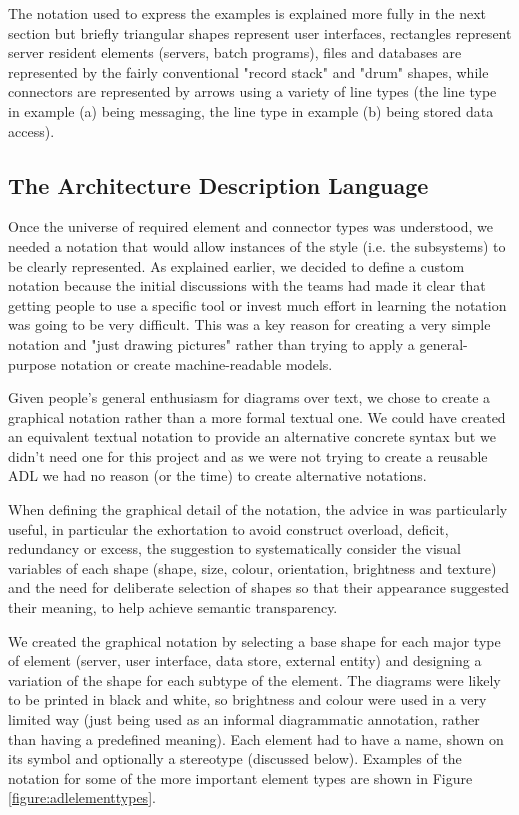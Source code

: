   The notation used to express the examples is explained more fully in the next section but briefly triangular shapes represent user interfaces, rectangles represent server resident elements (servers, batch programs), files and databases are represented by the fairly conventional "record stack" and "drum" shapes, while connectors are represented by arrows using a variety of line types (the line type in example (a) being messaging, the line type in example (b) being stored data access).

\subsection{The Architecture Description Language}

  Once the universe of required element and connector types was understood, we needed a notation that would allow instances of the style (i.e. the subsystems) to be clearly represented.  As explained earlier, we decided to define a custom notation because the initial discussions with the teams had made it clear that getting people to use a specific tool or invest much effort in learning the notation was going to be very difficult. This was a key reason for creating a very simple notation and "just drawing pictures" rather than trying to apply a general-purpose notation or create machine-readable models.

  Given people's general enthusiasm for diagrams over text, we chose to create a graphical notation rather than a more formal textual one. We could have created an equivalent textual notation to provide an alternative concrete syntax but we didn't need one for this project and as we were not trying to create a reusable ADL we had no reason (or the time) to create alternative notations.

  When defining the graphical detail of the notation, the advice in \cite{moody2009-notations} was particularly useful, in particular the exhortation to avoid construct overload, deficit, redundancy or excess, the suggestion to systematically consider the visual variables of each shape (shape, size, colour, orientation, brightness and texture) and the need for deliberate selection of shapes so that their appearance suggested their meaning, to help achieve semantic transparency.

  We created the graphical notation by selecting a base shape for each major type of element (server, user interface, data store, external entity) and designing a variation of the shape for each subtype of the element.  The diagrams were likely to be printed in black and white, so brightness and colour were used in a very limited way (just being used as an informal diagrammatic annotation, rather than having a predefined meaning).  Each element had to have a name, shown on its symbol and optionally a stereotype (discussed below).  Examples of the notation for some of the more important element types are shown in Figure \ref{figure:adlelementtypes}. 
  
